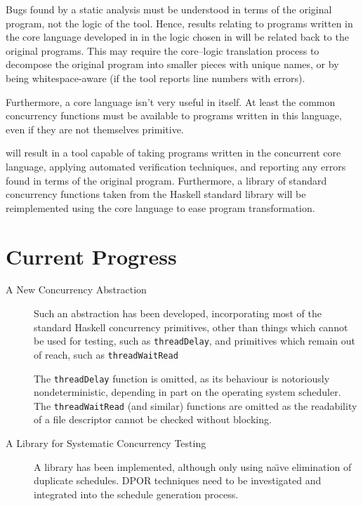 
Bugs found by a static analysis must be understood in terms of the
original program, not the logic of the tool. Hence, results relating
to programs written in the core language developed in  in the
logic chosen in  will be related back to the original
programs. This may require the core--logic translation process to
decompose the original program into smaller pieces with unique names,
or by being whitespace-aware (if the tool reports line numbers with
errors).

Furthermore, a core language isn't very useful in itself. At least the
common concurrency functions must be available to programs written in
this language, even if they are not themselves primitive.

 will result in a tool capable of taking programs written in
the concurrent core language, applying automated verification
techniques, and reporting any errors found in terms of the original
program. Furthermore, a library of standard concurrency functions
taken from the Haskell standard library will be reimplemented using
the core language to ease program transformation.

\section{Current Progress}
\label{sec:proposal-progress}

\begin{description}
  \item[A New Concurrency Abstraction] Such an abstraction has been
    developed, incorporating most of the standard Haskell concurrency
    primitives, other than things which cannot be used for testing,
    such as \verb|threadDelay|, and primitives which remain out of
    reach, such as \verb|threadWaitRead|

    The \verb|threadDelay| function is omitted, as its behaviour is
    notoriously nondeterministic, depending in part on the operating
    system scheduler. The \verb|threadWaitRead| (and similar)
    functions are omitted as the readability of a file descriptor
    cannot be checked without blocking.

  \item[A Library for Systematic Concurrency Testing] A library has
    been implemented, although only using na\"{\i}ve elimination of
    duplicate schedules. DPOR techniques need to be investigated and
    integrated into the schedule generation process.
\end{description}

